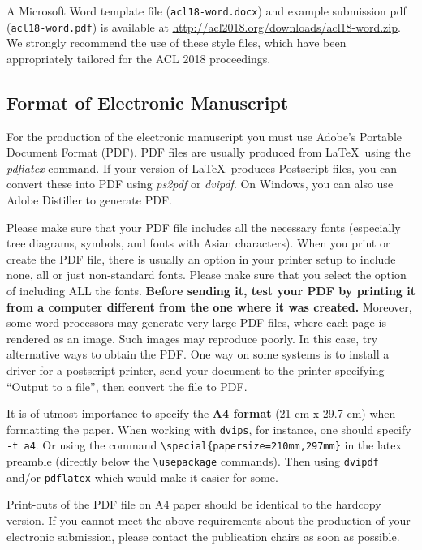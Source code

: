 \documentclass[11pt,a4paper]{article}
\begin{document}
A Microsoft Word template file ({\small\tt acl18-word.docx}) and example submission pdf ({\small\tt acl18-word.pdf})
is available at
\url{http://acl2018.org/downloads/acl18-word.zip}.
We strongly recommend the use of these style files, which have been
appropriately tailored for the ACL 2018 proceedings.

\subsection{Format of Electronic Manuscript}
\label{sect:pdf}

For the production of the electronic manuscript you must use Adobe's
Portable Document Format (PDF). PDF files are usually produced from
\LaTeX\ using the \textit{pdflatex} command. If your version of
\LaTeX\ produces Postscript files, you can convert these into PDF
using \textit{ps2pdf} or \textit{dvipdf}. On Windows, you can also use
Adobe Distiller to generate PDF.

Please make sure that your PDF file includes all the necessary fonts
(especially tree diagrams, symbols, and fonts with Asian
characters). When you print or create the PDF file, there is usually
an option in your printer setup to include none, all or just
non-standard fonts.  Please make sure that you select the option of
including ALL the fonts. \textbf{Before sending it, test your PDF by
  printing it from a computer different from the one where it was
  created.} Moreover, some word processors may generate very large PDF
files, where each page is rendered as an image. Such images may
reproduce poorly. In this case, try alternative ways to obtain the
PDF. One way on some systems is to install a driver for a postscript
printer, send your document to the printer specifying ``Output to a
file'', then convert the file to PDF.

It is of utmost importance to specify the \textbf{A4 format} (21 cm
x 29.7 cm) when formatting the paper. When working with
{\tt dvips}, for instance, one should specify {\tt -t a4}.
Or using the command \verb|\special{papersize=210mm,297mm}| in the latex
preamble (directly below the \verb|\usepackage| commands). Then using 
{\tt dvipdf} and/or {\tt pdflatex} which would make it easier for some.

Print-outs of the PDF file on A4 paper should be identical to the
hardcopy version. If you cannot meet the above requirements about the
production of your electronic submission, please contact the
publication chairs as soon as possible.
\end{document}
